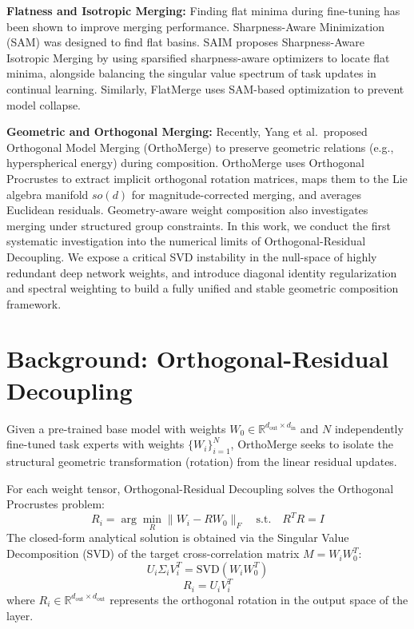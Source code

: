 \documentclass{article}
\theoremstyle{plain}
\theoremstyle{definition}
\theoremstyle{remark}
\begin{document}
\textbf{Flatness and Isotropic Merging:} Finding flat minima during fine-tuning has been shown to improve merging performance. Sharpness-Aware Minimization (SAM) \cite{foret2021sharpnessaware} was designed to find flat basins. SAIM \cite{anonymous2026saim} proposes Sharpness-Aware Isotropic Merging by using sparsified sharpness-aware optimizers to locate flat minima, alongside balancing the singular value spectrum of task updates in continual learning. Similarly, FlatMerge \cite{anonymous2026saim} uses SAM-based optimization to prevent model collapse.

\textbf{Geometric and Orthogonal Merging:} Recently, Yang et al.\ proposed Orthogonal Model Merging (OrthoMerge) \cite{yang2026orthogonal} to preserve geometric relations (e.g., hyperspherical energy) during composition. OrthoMerge uses Orthogonal Procrustes to extract implicit orthogonal rotation matrices, maps them to the Lie algebra manifold $so(d)$ for magnitude-corrected merging, and averages Euclidean residuals. Geometry-aware weight composition \cite{yang2024geometry} also investigates merging under structured group constraints. In this work, we conduct the first systematic investigation into the numerical limits of Orthogonal-Residual Decoupling. We expose a critical SVD instability in the null-space of highly redundant deep network weights, and introduce diagonal identity regularization and spectral weighting to build a fully unified and stable geometric composition framework.

\section{Background: Orthogonal-Residual Decoupling}
\label{sec:background}

Given a pre-trained base model with weights $W_0 \in \mathbb{R}^{d_{\text{out}} \times d_{\text{in}}}$ and $N$ independently fine-tuned task experts with weights $\{W_i\}_{i=1}^N$, OrthoMerge seeks to isolate the structural geometric transformation (rotation) from the linear residual updates.

For each weight tensor, Orthogonal-Residual Decoupling solves the Orthogonal Procrustes problem:
\begin{equation}
  R_i = \arg \min_{R} \|W_i - R W_0\|_F \quad \text{s.t.} \quad R^T R = I
\end{equation}
The closed-form analytical solution is obtained via the Singular Value Decomposition (SVD) of the target cross-correlation matrix $M = W_i W_0^T$:
\begin{equation}
  U_i \Sigma_i V_i^T = \text{SVD}(W_i W_0^T)
\end{equation}
\begin{equation}
  R_i = U_i V_i^T
\end{equation}
where $R_i \in \mathbb{R}^{d_{\text{out}} \times d_{\text{out}}}$ represents the orthogonal rotation in the output space of the layer.
\end{document}
